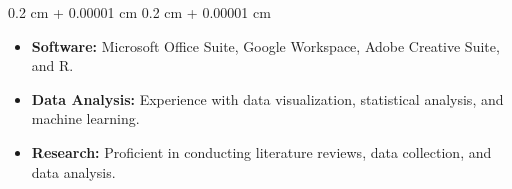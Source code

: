 \documentclass[10pt, letterpaper]{article}
\newenvironment{highlights}{
    \begin{itemize}[
        topsep=0.10 cm,
        parsep=0.10 cm,
        partopsep=0pt,
        itemsep=0pt,
        leftmargin=0.4 cm + 10pt
    ]
}{
    \end{itemize}
} %
\newenvironment{onecolentry}{
    \begin{adjustwidth}{
        0.2 cm + 0.00001 cm
    }{
        0.2 cm + 0.00001 cm
    }
}{
    \end{adjustwidth}
} %
\newenvironment{twocolentry}[2][]{
    \onecolentry
    \def\secondColumn{#2}
    \setcolumnwidth{\fill, 4.5 cm}
    \begin{paracol}{2}
}{
    \switchcolumn \raggedleft \secondColumn
    \end{paracol}
    \endonecolentry
} %
\begin{document}
\begin{onecolentry}
    \begin{highlights}
        \item \textbf{Software:} Microsoft Office Suite, Google Workspace, Adobe Creative Suite, and R.
        \item \textbf{Data Analysis:} Experience with data visualization, statistical analysis, and machine learning.
        \item \textbf{Research:} Proficient in conducting literature reviews, data collection, and data analysis.
    \end{highlights}
\end{onecolentry}




    




\end{document}
